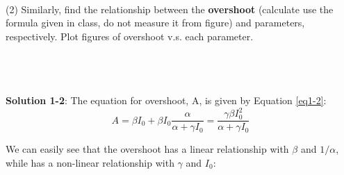 

\\
(2) Similarly, find the relationship between the \textbf{overshoot} (calculate use the formula
given in class, do not measure it from figure) and parameters, respectively. Plot
figures of overshoot v.s. each parameter.

\\
\\
\\
\textbf{Solution 1-2}:
The equation for overshoot, A, is given by Equation \ref{eq1-2}:
\begin{equation}
    A = \beta {I_0} + \beta {I_0}\frac{\alpha }{{\alpha  + \gamma {I_0}}} = \frac{{\gamma \beta I_0^2}}{{\alpha  + \gamma {I_0}}} \label{eq1-2}
\end{equation}

We can easily see that the overshoot has a linear relationship with $\beta$ and $1/\alpha$, while has a non-linear relationship with  $\gamma$ and  $I_0$:

